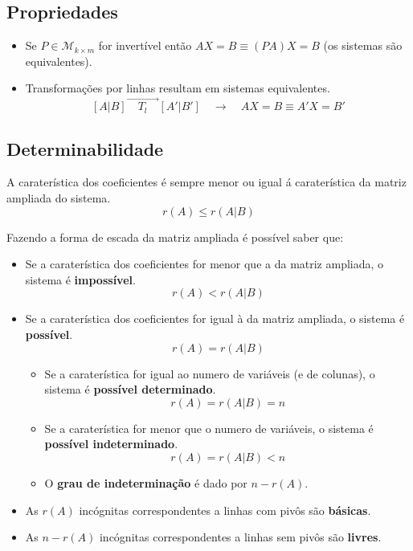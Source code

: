 \documentclass[]{report}
\begin{document}
\subsection{Propriedades}
\begin{itemize}
\item Se $P \in \mathcal{M}_{k \times m}$ for invertível então $AX=B \equiv (PA)X=B$ (os sistemas são equivalentes).
\item Transformações por linhas resultam em sistemas equivalentes.
$$\left[A|B\right]{\scriptstyle \overrightarrow{\quad T_l \quad}} \left[A'| B'\right] \quad \rightarrow \quad AX = B \equiv A'X=B'$$
\end{itemize}
\subsection{Determinabilidade}
A caraterística dos coeficientes é sempre menor ou igual á caraterística da matriz ampliada do sistema.
$$r(A) \leq r(A|B)$$
\begin{minipage}{\textwidth}
Fazendo a forma de escada da matriz ampliada é possível saber que:
\begin{itemize}
\item Se a caraterística dos coeficientes for menor que a da matriz ampliada, o sistema é \textbf{impossível}.
$$r(A) < r(A|B)$$
\item Se a caraterística dos coeficientes for igual à da matriz ampliada, o sistema é \textbf{possível}.
$$r(A) = r(A|B)$$
\begin{itemize}
\item Se a caraterística for igual ao numero de variáveis (e de colunas), o sistema é \textbf{possível determinado}.
$$r(A) = r(A|B) = n$$
\item Se a caraterística for menor que o numero de variáveis, o sistema é \textbf{possível indeterminado}.
$$r(A) = r(A|B) < n$$
\item O \textbf{grau de indeterminação} é dado por $n - r(A)$.
\end{itemize}
\item As $r(A)$ incógnitas correspondentes a linhas com pivôs são \textbf{básicas}.
\item As $n - r(A)$ incógnitas correspondentes a linhas sem pivôs são \textbf{livres}.
\end{itemize}
\end{minipage}\\[0.5cm]
\end{document}
